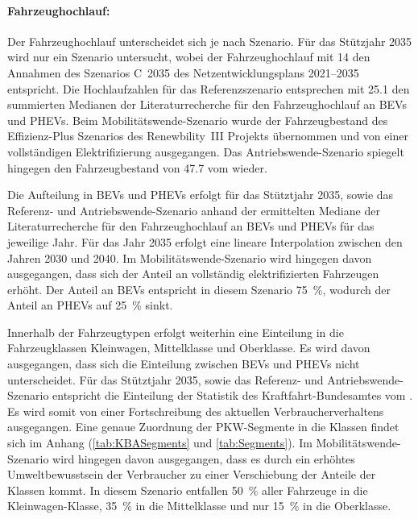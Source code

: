 \paragraph{Fahrzeughochlauf:}
Der Fahrzeughochlauf unterscheidet sich je nach Szenario.
Für das Stützjahr \num{2035} wird nur ein Szenario untersucht, wobei der Fahrzeughochlauf mit \SI{14}{\MioStk} den Annahmen des Szenarios C~\num{2035} des Netzentwicklungsplans \numrange[range-phrase=~{--}~]{2021}{2035} \cite{BNetzA2020} entspricht.
Die Hochlaufzahlen für das Referenzszenario entsprechen mit \SI{25.1}{\MioStk} den summierten Medianen der Literaturrecherche für den Fahrzeughochlauf an \glspl{BEV} und \glspl{PHEV}.
Beim Mobilitätswende-Szenario wurde der Fahrzeugbestand des Effizienz-Plus Szenarios des Renewbility~III Projekts \cite{Institut2016} übernommen und von einer vollständigen Elektrifizierung ausgegangen.
Das Antriebswende-Szenario spiegelt hingegen den Fahrzeugbestand von \SI{47.7}{\MioStk} vom  \cite{KBA2020} wieder.



Die Aufteilung in \glspl{BEV} und \glspl{PHEV} erfolgt für das Stütztjahr \num{2035}, sowie das Referenz- und Antriebswende-Szenario anhand der ermittelten Mediane der Literaturrecherche für den Fahrzeughochlauf an \glspl{BEV} und \glspl{PHEV} für das jeweilige Jahr.
Für das Jahr \num{2035} erfolgt eine lineare Interpolation zwischen den Jahren \num{2030} und \num{2040}.
Im Mobilitätswende-Szenario wird hingegen davon ausgegangen, dass sich der Anteil an vollständig elektrifizierten Fahrzeugen erhöht.
Der Anteil an \glspl{BEV} entspricht in diesem Szenario \SI{75}{\percent}, wodurch der Anteil an \glspl{PHEV} auf \SI{25}{\percent} sinkt.\medskip

Innerhalb der Fahrzeugtypen erfolgt weiterhin eine Einteilung in die Fahrzeugklassen Kleinwagen, Mittelklasse und Oberklasse.
Es wird davon ausgegangen, dass sich die Einteilung zwischen \glspl{BEV} und \glspl{PHEV} nicht unterscheidet.
Für das Stütztjahr \num{2035}, sowie das Referenz- und Antriebswende-Szenario entspricht die Einteilung der Statistik des Kraftfahrt-Bundesamtes \cite{KBASegments2020} vom .
Es wird somit von einer Fortschreibung des aktuellen Verbraucherverhaltens ausgegangen.
Eine genaue Zuordnung der \gls{PKW}-Segmente in die Klassen findet sich im Anhang (\autoref{tab:KBASegments} und \autoref{tab:Segments}).
Im Mobilitätswende-Szenario wird hingegen davon ausgegangen, dass es durch ein erhöhtes Umweltbewusstsein der Verbraucher zu einer Verschiebung der Anteile der Klassen kommt.
In diesem Szenario entfallen \SI{50}{\percent} aller Fahrzeuge in die Kleinwagen-Klasse, \SI{35}{\percent} in die Mittelklasse und nur \SI{15}{\percent} in die Oberklasse.

